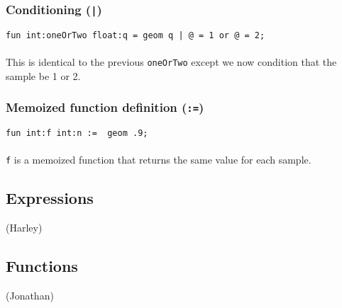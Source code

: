 \subsubsection{Conditioning (\texttt{|})}
\texttt{fun int:oneOrTwo float:q = geom q | @ = 1 or @ = 2;}\\
\\
This is identical to the previous \texttt{oneOrTwo} except we now condition that the sample be 1 or 2.

\subsubsection{Memoized function definition (\texttt{:=})}
\texttt{fun int:f int:n := ~geom .9;}\\
\\
\texttt{f} is a memoized function that returns the same value for each sample.

\subsection{Expressions}

(Harley)

\subsection{Functions}

(Jonathan)
